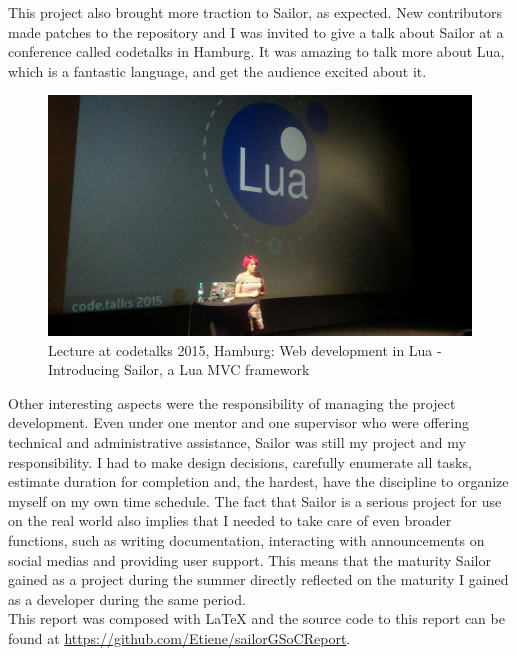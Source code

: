 \documentclass{article}
\begin{document}
This project also brought more traction to Sailor, as expected. New contributors made patches to the repository and I was invited to give a talk about Sailor at a conference called codetalks in Hamburg. It was amazing to talk more about Lua, which is a fantastic language, and get the audience excited about it. \\

\begin{figure}[h]
\centering\includegraphics[scale=0.36]{codetalks.jpg}
\caption{\label{fig:codetalks} Lecture at codetalks 2015, Hamburg: Web development in Lua - Introducing Sailor, a Lua MVC framework}
\end{figure}


Other interesting aspects were the responsibility of managing the project development. Even under one mentor and one supervisor who were offering technical and administrative assistance, Sailor was still my project and my responsibility. I had to make design decisions, carefully enumerate all tasks, estimate duration for completion and, the hardest, have the discipline to organize myself on my own time schedule. The fact that Sailor is a serious project for use on the real world also implies that I needed to take care of even broader functions, such as writing documentation, interacting with announcements on social medias and providing user support. This means that the maturity Sailor gained as a project during the summer directly reflected on the maturity I gained as a developer during the same period.\\

This report was composed with LaTeX and the source code to this report can be found at \url{https://github.com/Etiene/sailorGSoCReport}.



\clearpage
\newpage
\end{document}
